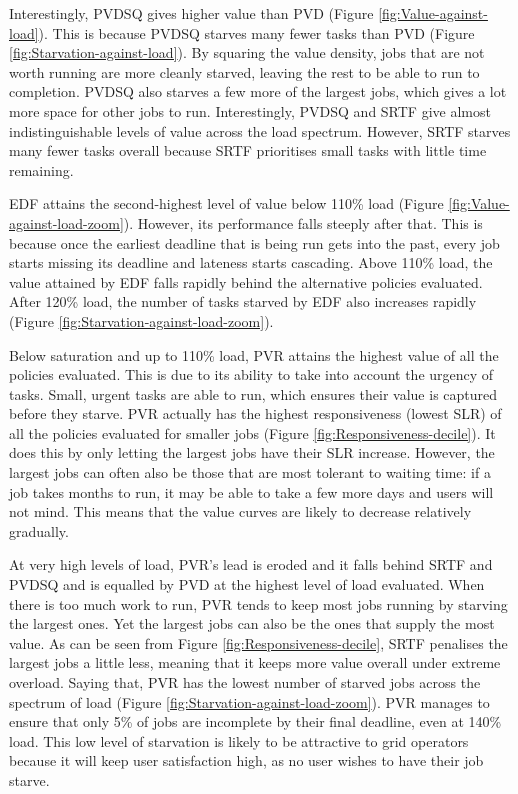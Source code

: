 \documentclass[english,british]{IEEEtran}
\begin{document}
Interestingly, PVDSQ gives higher value than PVD (Figure \ref{fig:Value-against-load}).
This is because PVDSQ starves many fewer tasks than PVD (Figure \ref{fig:Starvation-against-load}).
By squaring the value density, jobs that are not worth running are
more cleanly starved, leaving the rest to be able to run to completion.
PVDSQ also starves a few more of the largest jobs, which gives a lot
more space for other jobs to run. Interestingly, PVDSQ and SRTF give
almost indistinguishable levels of value across the load spectrum.
However, SRTF starves many fewer tasks overall because SRTF prioritises
small tasks with little time remaining.

EDF attains the second-highest level of value below 110\% load (Figure
\ref{fig:Value-against-load-zoom}). However, its performance falls
steeply after that. This is because once the earliest deadline that
is being run gets into the past, every job starts missing its deadline
and lateness starts cascading. Above 110\% load, the value attained
by EDF falls rapidly behind the alternative policies evaluated. After
120\% load, the number of tasks starved by EDF also increases rapidly
(Figure \ref{fig:Starvation-against-load-zoom}).

Below saturation and up to 110\% load, PVR attains the highest value
of all the policies evaluated. This is due to its ability to take
into account the urgency of tasks. Small, urgent tasks are able to
run, which ensures their value is captured before they starve. PVR
actually has the highest responsiveness (lowest SLR) of all the policies
evaluated for smaller jobs (Figure \ref{fig:Responsiveness-decile}).
It does this by only letting the largest jobs have their SLR increase.
However, the largest jobs can often also be those that are most tolerant
to waiting time: if a job takes months to run, it may be able to take
a few more days and users will not mind. This means that the value
curves are likely to decrease relatively gradually.

At very high levels of load, PVR's lead is eroded and it falls behind
SRTF and PVDSQ and is equalled by PVD at the highest level of load
evaluated. When there is too much work to run, PVR tends to keep most
jobs running by starving the largest ones. Yet the largest jobs can
also be the ones that supply the most value. As can be seen from Figure
\ref{fig:Responsiveness-decile}, SRTF penalises the largest jobs
a little less, meaning that it keeps more value overall under extreme
overload. Saying that, PVR has the lowest number of starved jobs across
the spectrum of load (Figure \ref{fig:Starvation-against-load-zoom}).
PVR manages to ensure that only 5\% of jobs are incomplete by their
final deadline, even at 140\% load. This low level of starvation is
likely to be attractive to grid operators because it will keep user
satisfaction high, as no user wishes to have their job starve.
\end{document}
